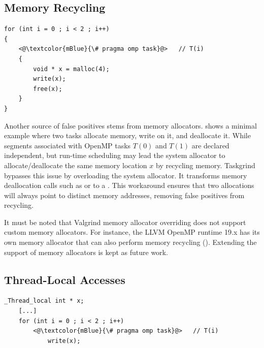 \subsection{Memory Recycling}

\begin{lstlisting}[style=CStyle, captionpos=b, caption={Memory Recycling false-positives}, label={lst:memory-recycling-false-positive}]
for (int i = 0 ; i < 2 ; i++)
{
	<@\textcolor{mBlue}{\# pragma omp task}@>	// T(i)
	{
		void * x = malloc(4);
		write(x);
		free(x);
	}
}
\end{lstlisting}

Another source of false positives stems from memory allocators.
 shows a minimal example where two tasks allocate memory, write on it, and deallocate it.
While segments associated with OpenMP tasks $T(0)$ and $T(1)$ are declared independent, but run-time scheduling may lead the system allocator to allocate/deallocate the same memory location $x$ by recycling memory.
Taskgrind bypasses this issue by overloading the system allocator.
It transforms memory deallocation calls such as  or  to a .
This workaround ensures that two allocations will always point to distinct memory addresses, removing false positives from recycling.

It must be noted that Valgrind memory allocator overriding does not support custom memory allocators.
For instance, the LLVM OpenMP runtime 19.x has its own memory allocator that can also perform memory recycling ().
Extending the support of memory allocators is kept as future work.

\subsection{Thread-Local Accesses}

\begin{lstlisting}[style=CStyle, captionpos=b, caption={Memory Recycling false-positives}, label={lst:thread-local-false-positive}]
	_Thread_local int * x;
	[...]
	for (int i = 0 ; i < 2 ; i++)
	    <@\textcolor{mBlue}{\# pragma omp task}@>	// T(i)
	        write(x);
\end{lstlisting}

